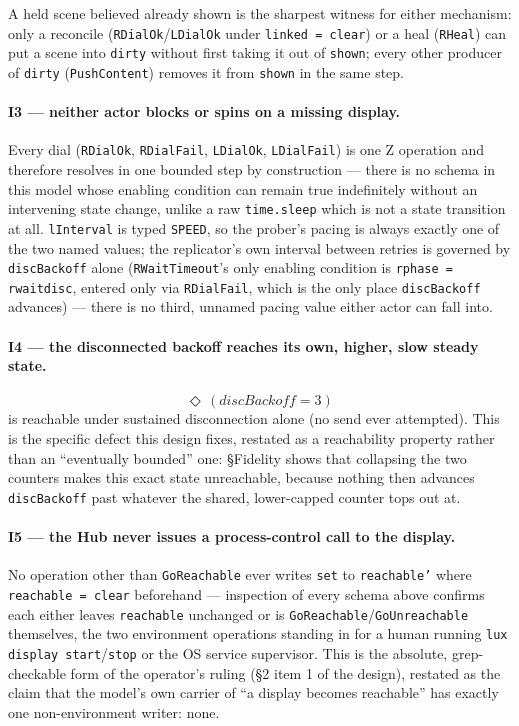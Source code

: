 \documentclass[a4paper,10pt,fleqn]{article}
\begin{document}
A held scene believed already shown is the sharpest witness for either
mechanism: only a reconcile (\texttt{RDialOk}/\texttt{LDialOk} under
\texttt{linked = clear}) or a heal (\texttt{RHeal}) can put a scene into
\texttt{dirty} without first taking it out of \texttt{shown}; every other
producer of \texttt{dirty} (\texttt{PushContent}) removes it from
\texttt{shown} in the same step.

\paragraph{I3 --- neither actor blocks or spins on a missing display.}
Every dial (\texttt{RDialOk}, \texttt{RDialFail}, \texttt{LDialOk},
\texttt{LDialFail}) is one Z operation and therefore resolves in one
bounded step by construction --- there is no schema in this model whose
enabling condition can remain true indefinitely without an intervening
state change, unlike a raw \texttt{time.sleep} which is not a state
transition at all.  \texttt{lInterval} is typed \texttt{SPEED}, so the
prober's pacing is always exactly one of the two named values; the
replicator's own interval between retries is governed by
\texttt{discBackoff} alone (\texttt{RWaitTimeout}'s only enabling condition
is \texttt{rphase = rwaitdisc}, entered only via \texttt{RDialFail}, which
is the only place \texttt{discBackoff} advances) --- there is no third,
unnamed pacing value either actor can fall into.

\paragraph{I4 --- the disconnected backoff reaches its own, higher, slow
steady state.}
\[
  \Diamond\,(discBackoff = 3)
\]
is reachable under sustained disconnection alone (no send ever attempted).
This is the specific defect this design fixes, restated as a reachability
property rather than an ``eventually bounded'' one: \S Fidelity shows that
collapsing the two counters makes this exact state unreachable, because
nothing then advances \texttt{discBackoff} past whatever the shared,
lower-capped counter tops out at.

\paragraph{I5 --- the Hub never issues a process-control call to the
display.}
No operation other than \texttt{GoReachable} ever writes \texttt{set} to
\texttt{reachable'} where \texttt{reachable = clear} beforehand ---
inspection of every schema above confirms each either leaves
\texttt{reachable} unchanged or is \texttt{GoReachable}/\texttt{GoUnreachable}
themselves, the two environment operations standing in for a human running
\texttt{lux display start}/\texttt{stop} or the OS service supervisor.  This
is the absolute, grep-checkable form of the operator's ruling (\S2 item 1
of the design), restated as the claim that the model's own carrier of
``a display becomes reachable'' has exactly one non-environment writer:
none.
\end{document}
